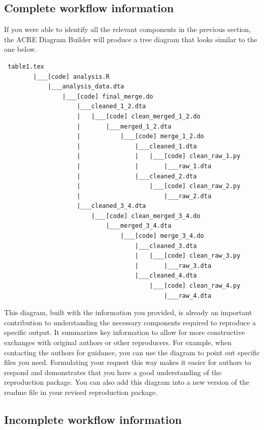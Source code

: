 \documentclass[]{book}
\begin{document}
\hypertarget{complete-tree}{%
\subsection{Complete workflow information}\label{complete-tree}}

If you were able to identify all the relevant components in the previous section, the ACRE Diagram Builder will produce a tree diagram that looks similar to the one below.

\begin{verbatim}
 table1.tex
        |___[code] analysis.R
            |___analysis_data.dta
                |___[code] final_merge.do
                    |___cleaned_1_2.dta
                    |   |___[code] clean_merged_1_2.do
                    |       |___merged_1_2.dta
                    |           |___[code] merge_1_2.do
                    |               |___cleaned_1.dta
                    |               |   |___[code] clean_raw_1.py
                    |               |       |___raw_1.dta
                    |               |___cleaned_2.dta
                    |                   |___[code] clean_raw_2.py
                    |                       |___raw_2.dta
                    |___cleaned_3_4.dta
                        |___[code] clean_merged_3_4.do
                            |___merged_3_4.dta
                                |___[code] merge_3_4.do
                                    |___cleaned_3.dta
                                    |   |___[code] clean_raw_3.py
                                    |       |___raw_3.dta
                                    |___cleaned_4.dta
                                        |___[code] clean_raw_4.py
                                            |___raw_4.dta
\end{verbatim}

This diagram, built with the information you provided, is already an important contribution to understanding the necessary components required to reproduce a specific output. It summarizes key information to allow for more constructive exchanges with original authors or other reproducers. For example, when contacting the authors for guidance, you can use the diagram to point out specific files you need. Formulating your request this way makes it easier for authors to respond and demonstrates that you have a good understanding of the reproduction package. You can also add this diagram into a new version of the readme file in your revised reproduction package.

\hypertarget{incomplete-workflow-information}{%
\subsection{Incomplete workflow information}\label{incomplete-workflow-information}}
\end{document}

